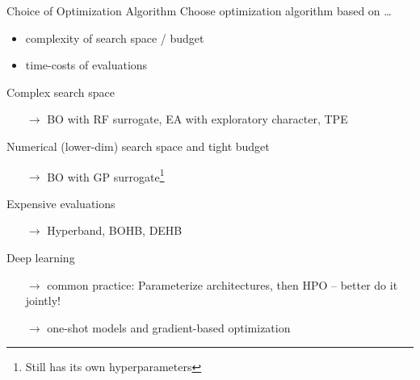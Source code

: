 	  \begin{frame}{Choice of Optimization Algorithm}
		Choose optimization algorithm based on \ldots
		\begin{itemize}
		  \item complexity of search space / budget
		  \item time-costs of evaluations
		\end{itemize}
	  
		\vspace{0.5em}
	  
		Complex search space
		\begin{itemize}
		  \item[$\rightarrow$] BO with RF surrogate, EA with exploratory character, TPE 
		\end{itemize}
		Numerical (lower-dim) search space and tight budget
		\begin{itemize}
		  \item[$\rightarrow$] BO with GP surrogate\footnote{Still has its own hyperparameters }
		\end{itemize}
		Expensive evaluations
		\begin{itemize}
		  \item[$\rightarrow$] Hyperband, BOHB, DEHB
		\end{itemize}
		Deep learning 
		\begin{itemize}
		  \item[$\rightarrow$] common practice: Parameterize architectures, then HPO -- better do it jointly!
		  \item[$\rightarrow$] one-shot models and gradient-based optimization
		\end{itemize}
	  
	  \end{frame}
	  


